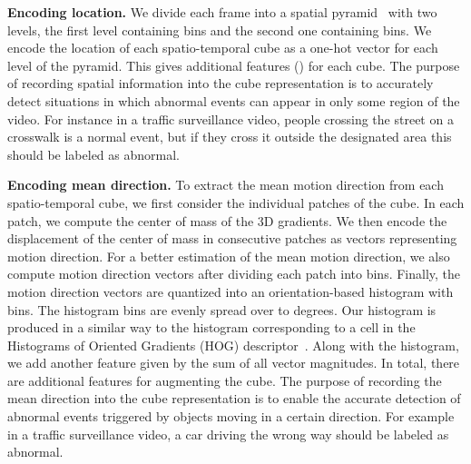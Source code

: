 \documentclass[10pt,twocolumn,letterpaper]{article}
\begin{document}
\noindent
{\bf Encoding location.}
We divide each frame into a spatial pyramid~\cite{Lazebnik-BBF-2006} with two levels, the first level containing  bins and the second one containing  bins. We encode the location of each spatio-temporal cube as a one-hot vector for each level of the pyramid. This gives  additional features () for each cube. The purpose of recording spatial information into the cube representation is to accurately detect situations in which abnormal events can appear in only some region of the video. For instance in a traffic surveillance video, people crossing the street on a crosswalk is a normal event, but if they cross it outside the designated area this should be labeled as abnormal.
 
\noindent
{\bf Encoding mean direction.}
To extract the mean motion direction from each spatio-temporal cube, we first consider the individual patches of the cube. In each patch, we compute the center of mass of the 3D gradients. We then encode the displacement of the center of mass in consecutive patches as vectors representing motion direction. For a better estimation of the mean motion direction, we also compute motion direction vectors after dividing each patch into  bins. Finally, the motion direction vectors are quantized into an orientation-based histogram with  bins. The histogram bins are evenly spread over  to  degrees. Our histogram is produced in a similar way to the histogram corresponding to a cell in the Histograms of Oriented Gradients (HOG) descriptor~\cite{Dalal-HOG-2005}. Along with the histogram, we add another feature given by the sum of all vector magnitudes. In total, there are  additional features for augmenting the cube. The purpose of recording the mean direction into the cube representation is to enable the accurate detection of abnormal events triggered by objects moving in a certain direction. For example in a traffic surveillance video, a car driving the wrong way should be labeled as abnormal.
\end{document}
